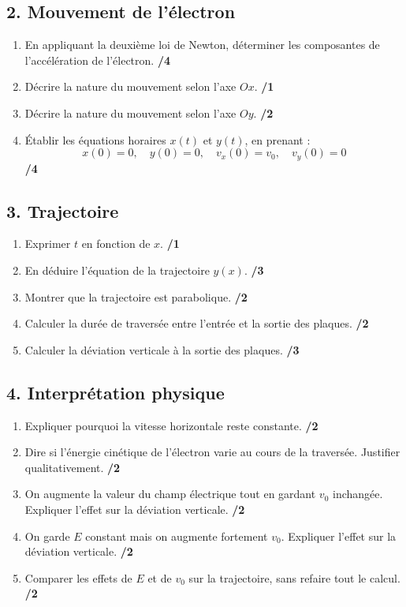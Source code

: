 \documentclass[11pt,a4paper]{article}
\begin{document}
\subsection*{2. Mouvement de l'électron}
\begin{enumerate}
    \item En appliquant la deuxième loi de Newton, déterminer les composantes de l'accélération de l'électron. \hfill \textbf{/4}
    \item Décrire la nature du mouvement selon l'axe \(Ox\). \hfill \textbf{/1}
    \item Décrire la nature du mouvement selon l'axe \(Oy\). \hfill \textbf{/2}
    \item Établir les équations horaires \(x(t)\) et \(y(t)\), en prenant :
    \[
    x(0)=0,\quad y(0)=0,\quad v_x(0)=v_0,\quad v_y(0)=0
    \]
    \hfill \textbf{/4}
\end{enumerate}

\subsection*{3. Trajectoire}
\begin{enumerate}
    \item Exprimer \(t\) en fonction de \(x\). \hfill \textbf{/1}
    \item En déduire l'équation de la trajectoire \(y(x)\). \hfill \textbf{/3}
    \item Montrer que la trajectoire est parabolique. \hfill \textbf{/2}
    \item Calculer la durée de traversée entre l'entrée et la sortie des plaques. \hfill \textbf{/2}
    \item Calculer la déviation verticale à la sortie des plaques. \hfill \textbf{/3}
\end{enumerate}

\subsection*{4. Interprétation physique}
\begin{enumerate}
    \item Expliquer pourquoi la vitesse horizontale reste constante. \hfill \textbf{/2}
    \item Dire si l'énergie cinétique de l'électron varie au cours de la traversée. Justifier qualitativement. \hfill \textbf{/2}
    \item On augmente la valeur du champ électrique tout en gardant \(v_0\) inchangée. Expliquer l'effet sur la déviation verticale. \hfill \textbf{/2}
    \item On garde \(E\) constant mais on augmente fortement \(v_0\). Expliquer l'effet sur la déviation verticale. \hfill \textbf{/2}
    \item Comparer les effets de \(E\) et de \(v_0\) sur la trajectoire, sans refaire tout le calcul. \hfill \textbf{/2}
\end{enumerate}
\end{document}
